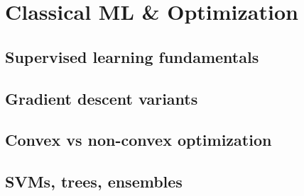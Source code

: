 
\section{Classical ML \& Optimization}

\subsection{Supervised learning fundamentals}


\subsection{Gradient descent variants}


\subsection{Convex vs non-convex optimization}


\subsection{SVMs, trees, ensembles}



